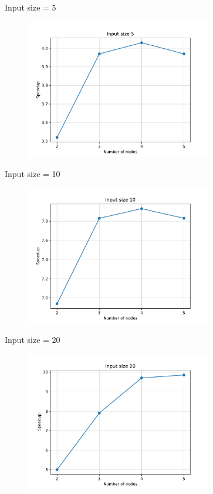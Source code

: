 \documentclass{beamer}
\begin{document}
\begin{frame}{Input size = 5}
\begin{figure}[H]
\centering
\includegraphics[width=3.2in]{../Paper/fig/speedup5}
\end{figure}
\end{frame}


\begin{frame}{Input size = 10}
\begin{figure}[H]
\centering
\includegraphics[width=3.2in]{../Paper/fig/speedup10}
\end{figure}
\end{frame}


\begin{frame}{Input size = 20}
\begin{figure}[H]
\centering
\includegraphics[width=3.2in]{../Paper/fig/speedup20}
\end{figure}
\end{frame}
\end{document}
